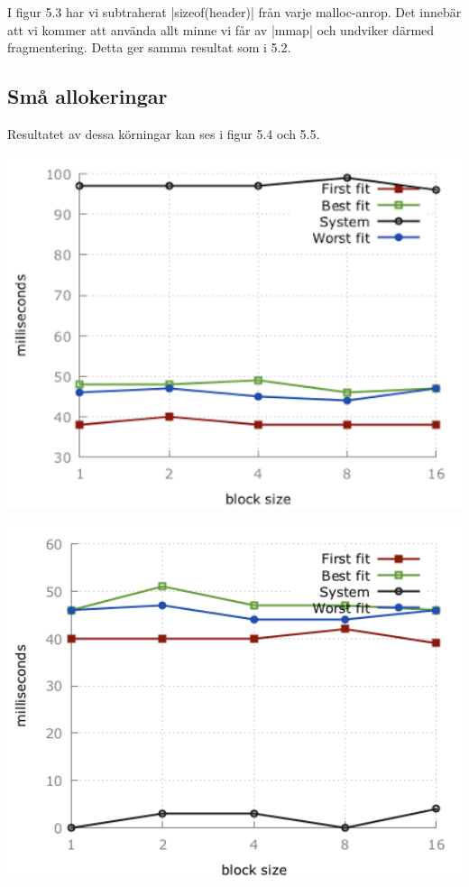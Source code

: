 \documentclass[paper=a4, fontsize=11pt]{scrartcl} %
\numberwithin{equation}{section} %
\numberwithin{figure}{section} %
\numberwithin{table}{section} %
\begin{document}
I figur 5.3 har vi subtraherat |sizeof(header)| från varje malloc-anrop.
Det innebär att vi kommer att använda allt minne vi får av |mmap| och undviker
därmed fragmentering. Detta ger samma resultat som i 5.2.


\subsection{Små allokeringar}

Resultatet av dessa körningar kan ses i figur 5.4 och 5.5.

\begin{minipage}{.5\textwidth}
    \centering
    \includegraphics[width=1\textwidth]{images/time_plot_small1.png}
    \label{fig:small1}
\end{minipage}%
\begin{minipage}{.5\textwidth}
    \centering
    \includegraphics[width=1\textwidth]{images/time_plot_small2.png}
    \label{fig:small2}
\end{minipage}\\\\
\end{document}
